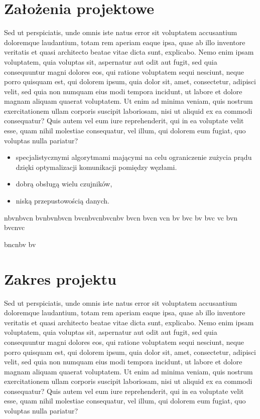 \documentclass{mgr}
\begin{document}
\section{Założenia projektowe}
Sed ut perspiciatis, unde omnis iste natus error sit voluptatem accusantium doloremque laudantium, totam rem aperiam eaque ipsa, quae ab illo inventore veritatis et quasi architecto beatae vitae dicta sunt, explicabo. Nemo enim ipsam voluptatem, quia voluptas sit, aspernatur aut odit aut fugit, sed quia consequuntur magni dolores eos, qui ratione voluptatem sequi nesciunt, neque porro quisquam est, qui dolorem ipsum, quia dolor sit, amet, consectetur, adipisci velit, sed quia non numquam eius modi tempora incidunt, ut labore et dolore magnam aliquam quaerat voluptatem. Ut enim ad minima veniam, quis nostrum exercitationem ullam corporis suscipit laboriosam, nisi ut aliquid ex ea commodi consequatur? Quis autem vel eum iure reprehenderit, qui in ea voluptate velit esse, quam nihil molestiae consequatur, vel illum, qui dolorem eum fugiat, quo voluptas nulla pariatur?
\begin{itemize}
\item specjalistycznymi algorytmami mającymi na celu ograniczenie zużycia prądu dzięki optymalizacji komunikacji pomiędzy węzłami.
\item dobrą obsługą wielu czujników,
\item niską przepustowością danych.
\end{itemize}

nbvnbvcn
bvnbvnbvcn
bvcnbvcnbvcnbv bvcn bvcn vcn bv bvc bv bvc vc bvn bvcnvc

bncnbv bv
\section{Zakres projektu}
Sed ut perspiciatis, unde omnis iste natus error sit voluptatem accusantium doloremque laudantium, totam rem aperiam eaque ipsa, quae ab illo inventore veritatis et quasi architecto beatae vitae dicta sunt, explicabo. Nemo enim ipsam voluptatem, quia voluptas sit, aspernatur aut odit aut fugit, sed quia consequuntur magni dolores eos, qui ratione voluptatem sequi nesciunt, neque porro quisquam est, qui dolorem ipsum, quia dolor sit, amet, consectetur, adipisci velit, sed quia non numquam eius modi tempora incidunt, ut labore et dolore magnam aliquam quaerat voluptatem. Ut enim ad minima veniam, quis nostrum exercitationem ullam corporis suscipit laboriosam, nisi ut aliquid ex ea commodi consequatur? Quis autem vel eum iure reprehenderit, qui in ea voluptate velit esse, quam nihil molestiae consequatur, vel illum, qui dolorem eum fugiat, quo voluptas nulla pariatur?
\end{document}
